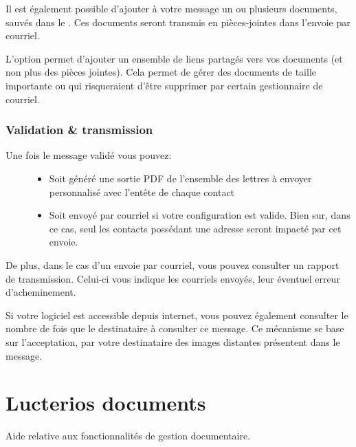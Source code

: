 \documentclass[a4paper,10pt,oneside,french]{sphinxmanual}
\begin{document}
Il est également possible d’ajouter à votre message un ou plusieurs documents, sauvés dans le .
Ces documents seront transmis en pièces-jointes dans l’envoie par courriel.

L’option  permet d’ajouter un ensemble de liens partagés vers vos documents (et non plus des pièces jointes).
Cela permet de gérer des documents de taille importante ou qui risqueraient d’être supprimer par certain gestionnaire de courriel.

\noindent{}


\subsection{Validation \& transmission}
\label{\detokenize{mailing/mailing:validation-transmission}}\begin{description}
\item[{Une fois le message validé vous pouvez:}] \leavevmode\begin{itemize}
\item {} 
Soit généré une sortie PDF de l’ensemble des lettres à envoyer personnalisé avec l’entête de chaque contact

\item {} 
Soit envoyé par courriel si votre configuration est valide. Bien sur, dans ce cas, seul les contacts possédant une adresse seront impacté par cet envoie.

\end{itemize}

\end{description}

De plus, dans le cas d’un envoie par courriel, vous pouvez consulter un rapport de transmission.
Celui-ci vous indique les courriels envoyés, leur éventuel erreur d’acheminement.

Si votre logiciel est accessible depuis internet, vous pouvez également consulter le nombre de fois que le destinataire à consulter ce message.
Ce mécanisme se base sur l’acceptation, par votre destinataire des images distantes présentent dans le message.

\noindent{}


\chapter{Lucterios documents}
\label{\detokenize{documents/index:lucterios-documents}}\label{\detokenize{documents/index::doc}}
Aide relative aux fonctionnalités de gestion documentaire.
\end{document}
